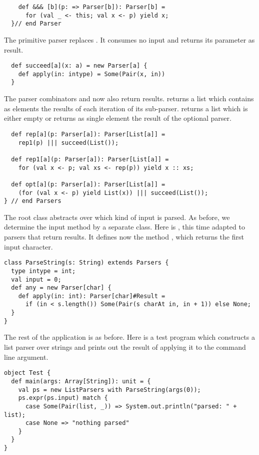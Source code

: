 {\begin{lstlisting}
    def &&& [b](p: => Parser[b]): Parser[b] = 
      for (val _ <- this; val x <- p) yield x;
  }// end Parser
\end{lstlisting}

The primitive parser  replaces . It consumes
no input and returns its parameter as result.
\begin{lstlisting}
  def succeed[a](x: a) = new Parser[a] {
    def apply(in: intype) = Some(Pair(x, in))
  }
\end{lstlisting}

The parser combinators  and  now also return
results.  returns a list which contains as elements the
results of each iteration of its sub-parser.  returns a list
which is either empty or returns as single element the result of the
optional parser.
\begin{lstlisting}
  def rep[a](p: Parser[a]): Parser[List[a]] =
    rep1(p) ||| succeed(List());

  def rep1[a](p: Parser[a]): Parser[List[a]] =
    for (val x <- p; val xs <- rep(p)) yield x :: xs;

  def opt[a](p: Parser[a]): Parser[List[a]] =
    (for (val x <- p) yield List(x)) ||| succeed(List());
} // end Parsers
\end{lstlisting}
The root class  abstracts over which kind of
input is parsed.  As before, we determine the input method by a separate class.
Here is , this time adapted to parsers that return results.
It defines now the method , which returns the first input character.
\begin{lstlisting}
class ParseString(s: String) extends Parsers {
  type intype = int;
  val input = 0;
  def any = new Parser[char] {
    def apply(in: int): Parser[char]#Result =
      if (in < s.length()) Some(Pair(s charAt in, in + 1)) else None;
  }
}
\end{lstlisting}
The rest of the application is as before. Here is a test program which
constructs a list parser over strings and prints out the result of
applying it to the command line argument.
\begin{lstlisting}
object Test {
  def main(args: Array[String]): unit = {
    val ps = new ListParsers with ParseString(args(0));
    ps.expr(ps.input) match {
      case Some(Pair(list, _)) => System.out.println("parsed: " + list);
      case None => "nothing parsed"
    }
  }
}
\end{lstlisting}

}
